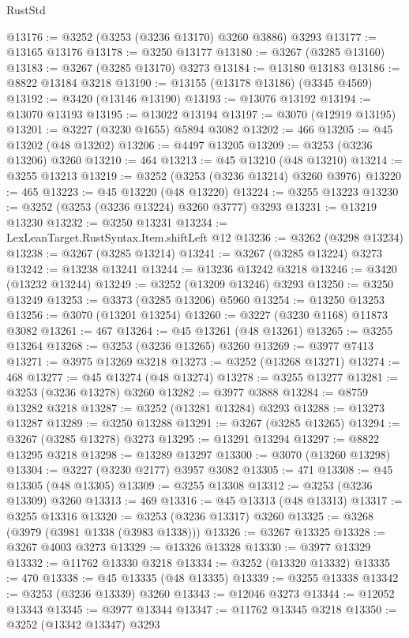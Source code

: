 \begin{lexlean}{RustStd}
\begin{coremodule}
@13176 := @3252 (@3253 (@3236 @13170) @3260 @3886) @3293
@13177 := @13165 @13176
@13178 := @3250 @13177
@13180 := @3267 (@3285 @13160)
@13183 := @3267 (@3285 @13170) @3273
@13184 := @13180 @13183
@13186 := @8822 @13184 @3218
@13190 := @13155 (@13178 @13186) (@3345 @4569)
@13192 := @3420 (@13146 @13190)
@13193 := @13076 @13192
@13194 := @13070 @13193
@13195 := @13022 @13194
@13197 := @3070 (@12919 @13195)
@13201 := @3227 (@3230 @1655) @5894 @3082
@13202 := 466
@13205 := @45 @13202 (@48 @13202)
@13206 := @4497 @13205
@13209 := @3253 (@3236 @13206) @3260
@13210 := 464
@13213 := @45 @13210 (@48 @13210)
@13214 := @3255 @13213
@13219 := @3252 (@3253 (@3236 @13214) @3260 @3976)
@13220 := 465
@13223 := @45 @13220 (@48 @13220)
@13224 := @3255 @13223
@13230 := @3252 (@3253 (@3236 @13224) @3260 @3777) @3293
@13231 := @13219 @13230
@13232 := @3250 @13231
@13234 := LexLeanTarget.RustSyntax.Item.shiftLeft @12
@13236 := @3262 (@3298 @13234)
@13238 := @3267 (@3285 @13214)
@13241 := @3267 (@3285 @13224) @3273
@13242 := @13238 @13241
@13244 := @13236 @13242 @3218
@13246 := @3420 (@13232 @13244)
@13249 := @3252 (@13209 @13246) @3293
@13250 := @3250 @13249
@13253 := @3373 (@3285 @13206) @5960
@13254 := @13250 @13253
@13256 := @3070 (@13201 @13254)
@13260 := @3227 (@3230 @1168) @11873 @3082
@13261 := 467
@13264 := @45 @13261 (@48 @13261)
@13265 := @3255 @13264
@13268 := @3253 (@3236 @13265) @3260
@13269 := @3977 @7413
@13271 := @3975 @13269 @3218
@13273 := @3252 (@13268 @13271)
@13274 := 468
@13277 := @45 @13274 (@48 @13274)
@13278 := @3255 @13277
@13281 := @3253 (@3236 @13278) @3260
@13282 := @3977 @3888
@13284 := @8759 @13282 @3218
@13287 := @3252 (@13281 @13284) @3293
@13288 := @13273 @13287
@13289 := @3250 @13288
@13291 := @3267 (@3285 @13265)
@13294 := @3267 (@3285 @13278) @3273
@13295 := @13291 @13294
@13297 := @8822 @13295 @3218
@13298 := @13289 @13297
@13300 := @3070 (@13260 @13298)
@13304 := @3227 (@3230 @2177) @3957 @3082
@13305 := 471
@13308 := @45 @13305 (@48 @13305)
@13309 := @3255 @13308
@13312 := @3253 (@3236 @13309) @3260
@13313 := 469
@13316 := @45 @13313 (@48 @13313)
@13317 := @3255 @13316
@13320 := @3253 (@3236 @13317) @3260
@13325 := @3268 (@3979 (@3981 @1338 (@3983 @1338)))
@13326 := @3267 @13325
@13328 := @3267 @4003 @3273
@13329 := @13326 @13328
@13330 := @3977 @13329
@13332 := @11762 @13330 @3218
@13334 := @3252 (@13320 @13332)
@13335 := 470
@13338 := @45 @13335 (@48 @13335)
@13339 := @3255 @13338
@13342 := @3253 (@3236 @13339) @3260
@13343 := @12046 @3273
@13344 := @12052 @13343
@13345 := @3977 @13344
@13347 := @11762 @13345 @3218
@13350 := @3252 (@13342 @13347) @3293

\end{coremodule}
\end{lexlean}
